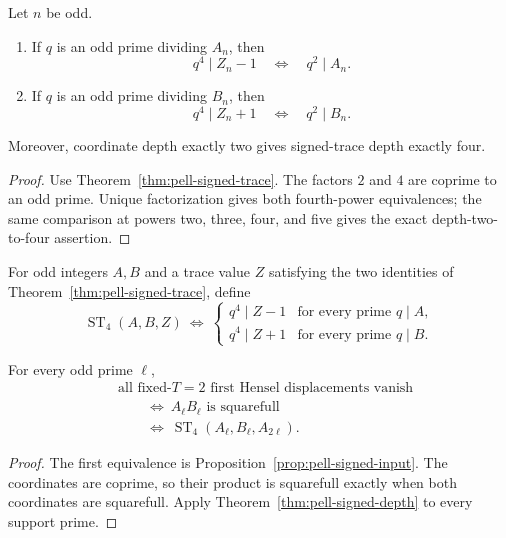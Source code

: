 \begin{theorem}\label{thm:pell-signed-depth}
Let $n$ be odd.
\begin{enumerate}
\item If $q$ is an odd prime dividing $A_n$, then
\[
 q^4\mid Z_n-1\quad\Longleftrightarrow\quad q^2\mid A_n.
\]
\item If $q$ is an odd prime dividing $B_n$, then
\[
 q^4\mid Z_n+1\quad\Longleftrightarrow\quad q^2\mid B_n.
\]
\end{enumerate}
Moreover, coordinate depth exactly two gives signed-trace depth exactly four.
\end{theorem}

\begin{proof}
Use Theorem~\ref{thm:pell-signed-trace}.  The factors $2$ and $4$ are coprime
to an odd prime.  Unique factorization gives both fourth-power equivalences;
the same comparison at powers two, three, four, and five gives the exact
depth-two-to-four assertion.
\end{proof}

For odd integers $A,B$ and a trace value $Z$ satisfying the two identities
of Theorem~\ref{thm:pell-signed-trace}, define
\[
\operatorname{ST}_{4}(A,B,Z)
\ \Longleftrightarrow\
\begin{cases}
 q^4\mid Z-1&\text{for every prime }q\mid A,\\
 q^4\mid Z+1&\text{for every prime }q\mid B.
\end{cases}
\]

\begin{corollary}\label{cor:pell-signed-gate}
For every odd prime $\ell$,
\[
\begin{aligned}
 &\text{all fixed-$T=2$ first Hensel displacements vanish}\\
 &\qquad\Longleftrightarrow\
 A_\ell B_\ell\text{ is squarefull}\\
 &\qquad\Longleftrightarrow\
 \operatorname{ST}_{4}(A_\ell,B_\ell,A_{2\ell}).
\end{aligned}
\]
\end{corollary}

\begin{proof}
The first equivalence is Proposition~\ref{prop:pell-signed-input}.  The coordinates are
coprime, so their product is squarefull exactly when both coordinates are
squarefull.  Apply Theorem~\ref{thm:pell-signed-depth} to every support prime.
\end{proof}

